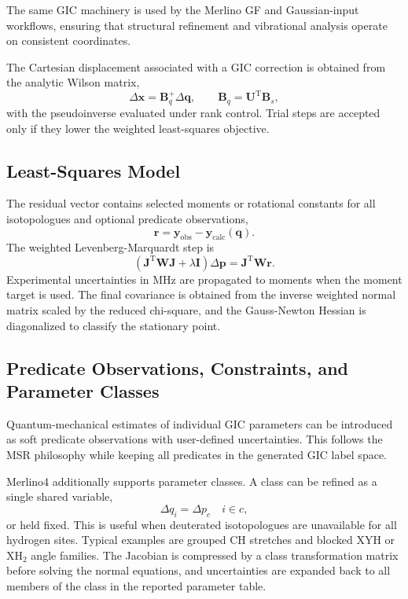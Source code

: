 \documentclass[journal=jctcce,manuscript=article,maxauthors=999]{achemso}
\begin{document}
The same GIC machinery is used by the Merlino GF and Gaussian-input workflows, ensuring that structural refinement and vibrational analysis operate on consistent coordinates.

The Cartesian displacement associated with a GIC correction is obtained from the analytic Wilson matrix,
\begin{equation}
\Delta\mathbf{x} = \mathbf{B}_{q}^{+}\Delta\mathbf{q},
\qquad
\mathbf{B}_{q}=\mathbf{U}^{\mathrm{T}}\mathbf{B}_{s},
\end{equation}
with the pseudoinverse evaluated under rank control. Trial steps are accepted only if they lower the weighted least-squares objective.

\subsection{Least-Squares Model}

The residual vector contains selected moments or rotational constants for all isotopologues and optional predicate observations,
\begin{equation}
\mathbf{r} = \mathbf{y}_{\mathrm{obs}}-\mathbf{y}_{\mathrm{calc}}(\mathbf{q}).
\end{equation}
The weighted Levenberg-Marquardt step is
\begin{equation}
\left(\mathbf{J}^{\mathrm{T}}\mathbf{W}\mathbf{J}+\lambda\mathbf{I}\right)\Delta\mathbf{p}
= \mathbf{J}^{\mathrm{T}}\mathbf{W}\mathbf{r}.
\end{equation}
Experimental uncertainties in MHz are propagated to moments when the moment target is used. The final covariance is obtained from the inverse weighted normal matrix scaled by the reduced chi-square, and the Gauss-Newton Hessian is diagonalized to classify the stationary point.

\subsection{Predicate Observations, Constraints, and Parameter Classes}

Quantum-mechanical estimates of individual GIC parameters can be introduced as soft predicate observations with user-defined uncertainties. This follows the MSR philosophy while keeping all predicates in the generated GIC label space.

Merlino4 additionally supports parameter classes. A class can be refined as a single shared variable,
\begin{equation}
\Delta q_i = \Delta p_c \quad i\in c,
\end{equation}
or held fixed. This is useful when deuterated isotopologues are unavailable for all hydrogen sites. Typical examples are grouped CH stretches and blocked XYH or XH$_2$ angle families. The Jacobian is compressed by a class transformation matrix before solving the normal equations, and uncertainties are expanded back to all members of the class in the reported parameter table.
\end{document}
